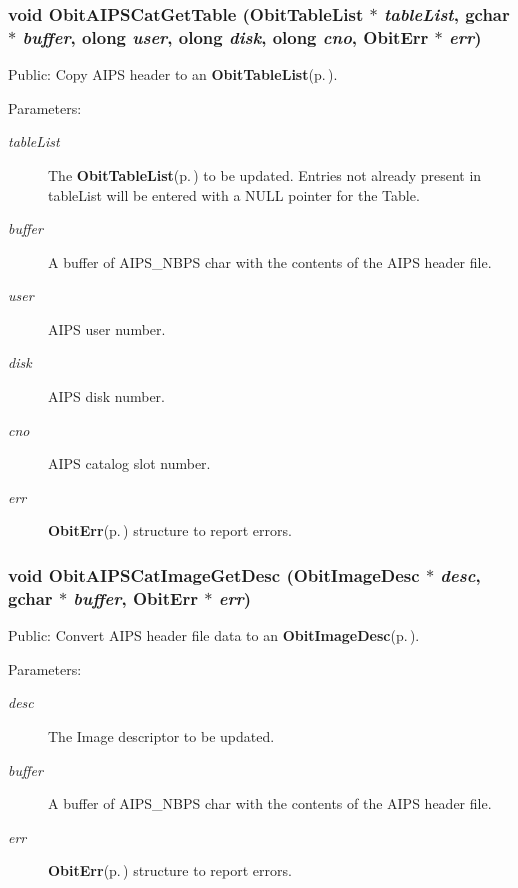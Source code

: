 \subsubsection{\setlength{\rightskip}{0pt plus 5cm}void Obit\-AIPSCat\-Get\-Table ({\bf Obit\-Table\-List} $\ast$ {\em table\-List}, gchar $\ast$ {\em buffer}, {\bf olong} {\em user}, {\bf olong} {\em disk}, {\bf olong} {\em cno}, {\bf Obit\-Err} $\ast$ {\em err})}\label{ObitAIPSCat_8h_a4}


Public: Copy AIPS header to an {\bf Obit\-Table\-List}{\rm (p.\,\pageref{structObitTableList})}. 

\begin{Desc}
\item[Parameters:]
\begin{description}
\item[{\em table\-List}]The {\bf Obit\-Table\-List}{\rm (p.\,\pageref{structObitTableList})} to be updated. Entries not already present in table\-List will be entered with a NULL pointer for the Table. \item[{\em buffer}]A buffer of AIPS\_\-NBPS char with the contents of the AIPS header file. \item[{\em user}]AIPS user number. \item[{\em disk}]AIPS disk number. \item[{\em cno}]AIPS catalog slot number. \item[{\em err}]{\bf Obit\-Err}{\rm (p.\,\pageref{structObitErr})} structure to report errors. \end{description}
\end{Desc}
\subsubsection{\setlength{\rightskip}{0pt plus 5cm}void Obit\-AIPSCat\-Image\-Get\-Desc ({\bf Obit\-Image\-Desc} $\ast$ {\em desc}, gchar $\ast$ {\em buffer}, {\bf Obit\-Err} $\ast$ {\em err})}\label{ObitAIPSCat_8h_a0}


Public: Convert AIPS header file data to an {\bf Obit\-Image\-Desc}{\rm (p.\,\pageref{structObitImageDesc})}. 

\begin{Desc}
\item[Parameters:]
\begin{description}
\item[{\em desc}]The Image descriptor to be updated. \item[{\em buffer}]A buffer of AIPS\_\-NBPS char with the contents of the AIPS header file. \item[{\em err}]{\bf Obit\-Err}{\rm (p.\,\pageref{structObitErr})} structure to report errors. \end{description}
\end{Desc}
